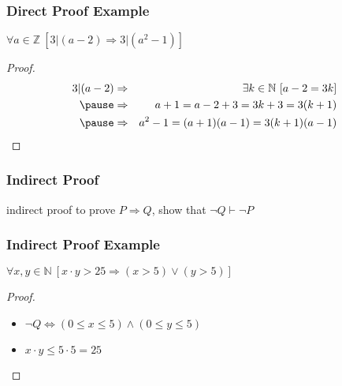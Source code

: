 \documentclass[dvipsnames]{beamer}
\begin{document}
\begin{frame}
  \frametitle{Direct Proof Example}

  \begin{theorem}
    $\forall a \in \mathbb{Z}~[3 | (a-2) \Rightarrow 3 | (a^2-1)]$
  \end{theorem}

  \pause
  \begin{proof}
    \begin{eqnarray*}
      3 | (a-2) & \Rightarrow & \exists k \in \mathbb{N}~[a-2 = 3k]\\\pause
                & \Rightarrow & a+1 = a-2 + 3 = 3k+3 = 3(k+1)\\\pause
                & \Rightarrow & a^2-1 = (a+1)(a-1) = 3(k+1)(a-1)
    \end{eqnarray*}
  \end{proof}
\end{frame}

\begin{frame}
  \frametitle{Indirect Proof}

  \begin{block}{indirect proof}
    to prove $P \Rightarrow Q$, show that $\neg Q \vdash \neg P$
  \end{block}
\end{frame}

\begin{frame}
  \frametitle{Indirect Proof Example}

  \begin{theorem}
    $\forall x,y \in \mathbb{N}~[x \cdot y > 25
      \Rightarrow (x > 5) \vee (y > 5)]$
  \end{theorem}

  \pause
  \begin{proof}
    \begin{itemize}
      \item $\neg Q \Leftrightarrow (0 \leq x \leq 5) \wedge (0 \leq y \leq 5)$

      \pause
      \item $x \cdot y \leq 5 \cdot 5 = 25$
    \end{itemize}
  \end{proof}
\end{frame}
\end{document}
